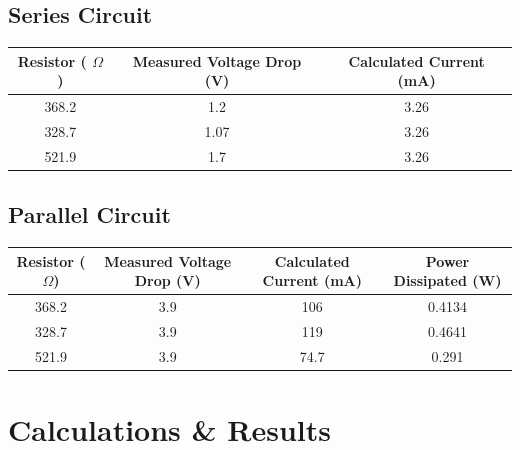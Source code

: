 \documentclass[titlepage]{article}
\begin{document}
	\subsection{Series Circuit} 
		\begin{center}
		\begin{tabular}{c|c|c}
			Resistor ( \(\Omega\)) & Measured Voltage Drop (V) & Calculated Current (mA) \\
			\hline
			368.2 & 1.2 & 3.26\\
			328.7 & 1.07 & 3.26\\
			521.9 & 1.7 & 3.26
		\end{tabular}
	\end{center}
	\subsection{Parallel Circuit}
		\begin{center}
		\begin{tabular}{c|c|c|c}
			Resistor (\(\Omega\)) & Measured Voltage Drop (V) & Calculated Current (mA) & Power Dissipated (W)\\
			\hline
			368.2 & 3.9 & 106 & 0.4134\\
			328.7 & 3.9 & 119 & 0.4641\\
			521.9 & 3.9 & 74.7 & 0.291
		\end{tabular}
	\end{center}
    \section{Calculations \& Results}
\end{document}
